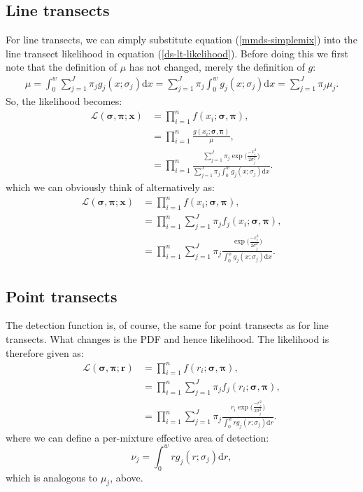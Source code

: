 \subsection{Line transects}
For line transects, we can simply substitute equation (\ref{mmds-simplemix}) into the line transect likelihood in equation (\ref{ds-lt-likelihood}). Before doing this we first note that the definition of $\mu$ has not changed, merely the definition of $g$:
\begin{align*}
\mu = \int_0^w \sum_{j=1}^J \pi_j g_j(x;\sigma_j) \text{d}x = \sum_{j=1}^J \pi_j \int_0^w  g_j(x;\sigma_j) \text{d}x = \sum_{j=1}^J \pi_j \mu_j.
\end{align*}
So, the likelihood becomes:
\begin{align}
\mathcal{L}(\bm{\sigma}, \bm{\pi}; \bm{x}) &= \prod_{i=1}^n f(x_i;\bm{\sigma}, \bm{\pi}),\\
&= \prod_{i=1}^n \frac{g(x_i;\bm{\sigma}, \bm{\pi})}{\mu},\\
&= \prod_{i=1}^n \frac{\sum_{j=1}^J \pi_j \exp \Big( \frac{-x_i^2}{2 \sigma_j^2}\Big)}{\sum_{j=1}^J \pi_j \int_0^w  g_j(x;\sigma_j) \text{d}x}.
\label{mmds-lt-likelihood}
\end{align}
which we can obviously think of alternatively as:
\begin{align}
\mathcal{L}(\bm{\sigma}, \bm{\pi}; \bm{x}) &= \prod_{i=1}^n f(x_i;\bm{\sigma}, \bm{\pi}),\\
&= \prod_{i=1}^n \sum_{j=1}^J \pi_j f_j(x_i;\bm{\sigma}, \bm{\pi}),\\
&= \prod_{i=1}^n \sum_{j=1}^J \pi_j \frac{\exp \Big( \frac{-x_i^2}{2 \sigma_j^2}\Big)}{\int_0^w  g_j(x;\sigma_j) \text{d}x}.
\label{mmds-lt-likelihood-pdf}
\end{align}

\subsection{Point transects}
The detection function is, of course, the same for point transects as for line transects. What changes is the PDF and hence likelihood. The likelihood is therefore given as:
\begin{align}
\mathcal{L}(\bm{\sigma}, \bm{\pi}; \bm{r}) &= \prod_{i=1}^n f(r_i;\bm{\sigma}, \bm{\pi}),\\
&= \prod_{i=1}^n \sum_{j=1}^J \pi_j f_j(r_i;\bm{\sigma}, \bm{\pi}),\\
&= \prod_{i=1}^n \sum_{j=1}^J \pi_j \frac{r_i \exp \Big( \frac{-r_i^2}{2 \sigma_j^2}\Big)}{\int_0^w r  g_j(r;\sigma_j) \text{d}r}.
\label{mmds-pt-likelihood-pdf}
\end{align}
where we can define a per-mixture effective area of detection:
\begin{equation}
\nu_j=\int_0^w r  g_j(r;\sigma_j) \text{d}r,
\end{equation}
which is analogous to $\mu_j$, above.

